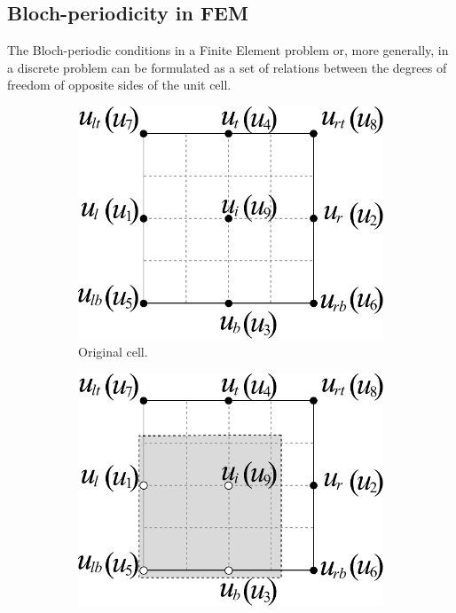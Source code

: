 \subsection{Bloch-periodicity in FEM}
The Bloch-periodic conditions in a Finite Element problem or, more generally, in a discrete problem can be formulated as a set of relations between the degrees of freedom of opposite sides of the unit cell.
\begin{figure}[h]
\centering
	\begin{subfigure}[b]{0.3\textwidth}
		\includegraphics[width=\textwidth]{img/cell_FEM.pdf}
		\caption{Original cell.}
	\end{subfigure}\quad
%
	\begin{subfigure}[b]{0.3\textwidth}\qquad
		\includegraphics[width=\textwidth]{img/cell_FEM-2.pdf}

\end{subfigure}
\end{figure}
